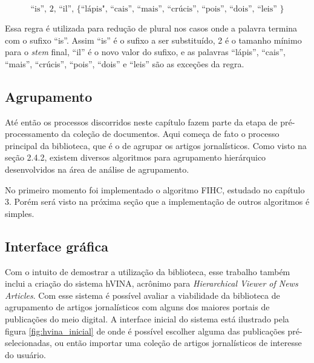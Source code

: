 \documentclass[a4paper,12pt]{article}
\begin{document}
\begin{equation}
  \text{“is”, 2, “il”, \{ “lápis", “cais”, “mais”, “crúcis”, “pois”, “dois”, “leis” \}}
\end{equation}

Essa regra é utilizada para redução de plural nos casos onde a palavra termina com o sufixo “is”. Assim “is” é o sufixo a ser substituído, 2 é o tamanho mínimo para o \textit{stem} final, “il” é o novo valor do sufixo, e as palavras “lápis”, “cais”, “mais”, “crúcis”, “pois”, “dois” e “leis” são as exceções da regra. 

\subsection {Agrupamento}
\label {sec:agrupamento}

Até então os processos discorridos neste capítulo fazem parte da etapa de pré-processamento da coleção de documentos. Aqui começa de fato o processo principal da biblioteca, que é o de agrupar os artigos jornalísticos. Como visto na seção 2.4.2, existem diversos algoritmos para agrupamento hierárquico desenvolvidos na área de análise de agrupamento. 

No primeiro momento foi implementado o algoritmo FIHC, estudado no capítulo 3. Porém será visto na próxima seção que a implementação de outros algoritmos é simples.

\subsection {Interface gráfica}
\label {sec:interface_grafica}

Com o intuito de demostrar a utilização da biblioteca, esse trabalho também inclui a criação do sistema hVINA, acrônimo para \textit{Hierarchical Viewer of News Articles}. Com esse sistema é possível avaliar a viabilidade da biblioteca de agrupamento de artigos jornalísticos com alguns dos maiores portais de publicações do meio digital. A interface inicial do sistema está ilustrado pela figura \ref{fig:hvina_inicial} de onde é possível escolher alguma das publicações pré-selecionadas, ou então importar uma coleção de artigos jornalísticos de interesse do usuário.
\end{document}
